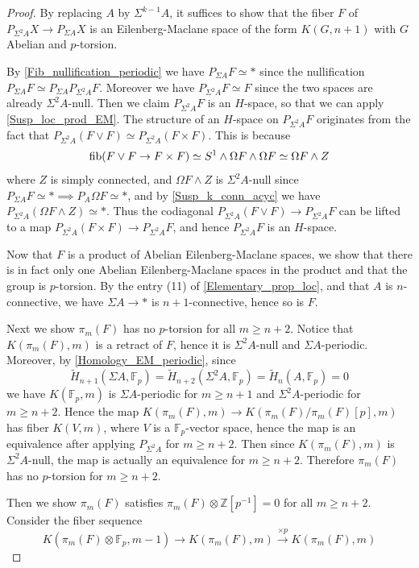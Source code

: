 	\begin{proof}
		By replacing $A$ by $\Sigma^{k-1}A$, it suffices to show that the fiber $F$ of $P_{\Sigma^2A}X\to P_{\Sigma A}X$ is an Eilenberg-Maclane space of the form $K(G,n+1)$ with $G$ Abelian and $p$-torsion. 

		By \cref{Fib_nullification_periodic} we have $P_{\Sigma A}F\simeq*$ since the nullification $P_{\Sigma A}F\simeq P_{\Sigma A}P_{\Sigma^2A}F$. Moreover we have $P_{\Sigma^2A}F\simeq F$ since the two spaces are already $\Sigma^2A$-null. Then we claim $P_{\Sigma^2A}F$ is an $H$-space, so that we can apply \cref{Susp_loc_prod_EM}. The structure of an $H$-space on $P_{\Sigma^2A}F$ originates from the fact that $P_{\Sigma^2A}(F\vee F)\simeq P_{\Sigma^2A}(F\times F)$. This is because 
		\[ \operatorname{\mathrm{fib}}(F\vee F\to F\times F)\simeq S^1\wedge\Omega F\wedge\Omega F\simeq\Omega F\wedge Z \]
		where $Z$ is simply connected, and $\Omega F\wedge Z$ is $\Sigma^2A$-null since $P_{\Sigma A}F\simeq*\implies P_A\Omega F\simeq *$, and by \cref{Susp_k_conn_acyc} we have $P_{\Sigma^2A}(\Omega F\wedge Z)\simeq*$. Thus the codiagonal $P_{\Sigma^2A}(F\vee F)\to P_{\Sigma^2A}F$ can be lifted to a map $P_{\Sigma^2A}(F\times F)\to P_{\Sigma^2A}F$, and hence $P_{\Sigma^2A}F$ is an $H$-space. 

		Now that $F$ is a product of Abelian Eilenberg-Maclane spaces, we show that there is in fact only one Abelian Eilenberg-Maclane spaces in the product and that the group is $p$-torsion. By the entry (11) of \cref{Elementary_prop_loc}, and that $A$ is $n$-connective, we have $\Sigma A\to *$ is $n+1$-connective, hence so is $F$. 

		Next we show $\pi_m(F)$ has no $p$-torsion for all $m\geq n+2$. Notice that $K(\pi_m(F),m)$ is a retract of $F$, hence it is $\Sigma^2A$-null and $\Sigma A$-periodic. Moreover, by \cref{Homology_EM_periodic}, since 
		\[ \tilde{H}_{n+1}(\Sigma A,\mathbb{F}_p)=\tilde{H}_{n+2}(\Sigma^2A,\mathbb{F}_p)=\tilde{H}_n(A,\mathbb{F}_p)=0 \]
		we have $K(\mathbb{F}_p,m)$ is $\Sigma A$-periodic for $m\geq n+1$ and $\Sigma^2A$-periodic for $m\geq n+2$. Hence the map $K(\pi_m(F),m)\to K(\pi_m(F)/\pi_m(F)[p],m)$ has fiber $K(V,m)$, where $V$ is a $\mathbb{F}_p$-vector space, hence the map is an equivalence after applying $P_{\Sigma^2A}$ for $m\geq n+2$. Then since $K(\pi_m(F),m)$ is $\Sigma^2A$-null, the map is actually an equivalence for $m\geq n+2$. Therefore $\pi_m(F)$ has no $p$-torsion for $m\geq n+2$. 

		Then we show $\pi_m(F)$ satisfies $\pi_m(F)\otimes\mathbb{Z}[p^{-1}]=0$ for all $m\geq n+2$. Consider the fiber sequence 
		\[ K(\pi_m(F)\otimes\mathbb{F}_p,m-1)\to K(\pi_m(F),m)\xrightarrow{\times p}K(\pi_m(F),m) \]


\end{proof}
